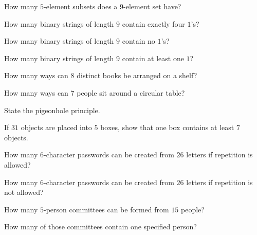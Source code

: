 \begin{exercise}[1]
How many \(5\)-element subsets does a \(9\)-element set have?
\end{exercise}

\begin{exercise}[1]
How many binary strings of length \(9\) contain exactly four \(1\)'s?
\end{exercise}

\begin{exercise}[1]
How many binary strings of length \(9\) contain no \(1\)'s?
\end{exercise}

\begin{exercise}[1]
How many binary strings of length \(9\) contain at least one \(1\)?
\end{exercise}

\begin{exercise}[1]
How many ways can \(8\) distinct books be arranged on a shelf?
\end{exercise}

\begin{exercise}[1]
How many ways can \(7\) people sit around a circular table?
\end{exercise}

\begin{exercise}[1]
State the pigeonhole principle.
\end{exercise}

\begin{exercise}[1]
If \(31\) objects are placed into \(5\) boxes, show that one box
contains at least \(7\) objects.
\end{exercise}

\begin{exercise}[2]
How many \(6\)-character passwords can be created from \(26\) letters
if repetition is allowed?
\end{exercise}

\begin{exercise}[2]
How many \(6\)-character passwords can be created from \(26\) letters
if repetition is not allowed?
\end{exercise}

\begin{exercise}[2]
How many \(5\)-person committees can be formed from \(15\) people?
\end{exercise}

\begin{exercise}[2]
How many of those committees contain one specified person?
\end{exercise}

